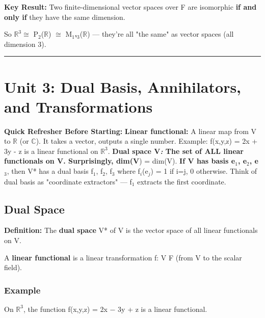 \documentclass[12pt,a4paper,openany]{book}
\begin{document}
{{\begin{tcolorbox}[colback=warningbg!30,colframe=warningborder,title=\textbf{Important -- Exam Alert},breakable,boxrule=1.5pt]
\textbf{Key Result:} Two finite-dimensional vector spaces over F are isomorphic \textbf{if and only if} they have the same dimension.
\end{tcolorbox}

So $\mathbb{R}^3\cong$ P$_2$($\mathbb{R}$) $\cong$ M$_1$ₓ$_3$($\mathbb{R}$) — they're all "the same" as vector spaces (all dimension 3).

\bigskip\noindent\rule{\textwidth}{0.4pt}\bigskip

\section{Unit 3: Dual Basis, Annihilators, and Transformations}

\begin{prereqbox}
 \textbf{Quick Refresher Before Starting:}
\textbf{Linear functional:} A linear map from V to $\mathbb{R}$ (or $\mathbb{C}$). It takes a vector, outputs a single number.
Example: f(x,y,z) = 2x + 3y - z is a linear functional on $\mathbb{R}^3$.
\textbf{Dual space V\textit{:} The set of ALL linear functionals on V. Surprisingly, dim(V}) = dim(V).
\textbf{If V has basis {e$_1$, e$_2$, e$_3$}}, then V* has a dual basis {f$_1$, f$_2$, f$_3$} where f$_i$(e$_j$) = 1 if i=j, 0 otherwise.
Think of dual basis as "coordinate extractors" — f$_1$ extracts the first coordinate.
\end{prereqbox}


\subsection{Dual Space}

\begin{tcolorbox}[colback=lightblue!30,colframe=defgreen,title=\textbf{Definition},breakable,boxrule=1.5pt]
\textbf{Definition:} The \textbf{dual space} V* of V is the vector space of all linear functionals on V.
\end{tcolorbox}

A \textbf{linear functional} is a linear transformation f: V  F (from V to the scalar field).

\subsubsection{Example}
On $\mathbb{R}^3$, the function f(x,y,z) = 2x − 3y + z is a linear functional.

}}
\end{document}
